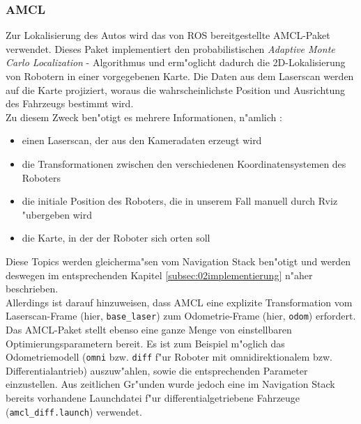 \subsubsection{AMCL}
\label{subsec:02amcl}

Zur Lokalisierung des Autos wird das von ROS bereitgestellte AMCL-Paket verwendet. Dieses Paket implementiert den probabilistischen \emph{Adaptive Monte Carlo Localization} - Algorithmus und erm"oglicht dadurch die 2D-Lokalisierung von Robotern in einer vorgegebenen Karte. Die Daten aus dem Laserscan werden auf die Karte projiziert, woraus die wahrscheinlichste Position und Ausrichtung des Fahrzeugs bestimmt wird.\\
Zu diesem Zweck ben"otigt es mehrere Informationen, n"amlich : 
\begin{itemize}
\item einen Laserscan, der aus den Kameradaten erzeugt wird 
\item die Transformationen zwischen den verschiedenen Koordinatensystemen des Roboters
\item die initiale Position des Roboters, die in unserem Fall manuell durch Rviz "ubergeben wird
\item die Karte, in der der Roboter sich orten soll
\end{itemize}

Diese Topics werden gleicherma"sen vom Navigation Stack ben"otigt und werden deswegen im entsprechenden Kapitel \ref{subsec:02implementierung} n"aher beschrieben.\\
Allerdings ist darauf hinzuweisen, dass AMCL eine explizite Transformation vom Laserscan-Frame (hier, \texttt{base\_laser}) zum Odometrie-Frame (hier, \texttt{odom}) erfordert.\\
Das AMCL-Paket stellt ebenso eine ganze Menge von einstellbaren Optimierungsparametern bereit. Es ist zum Beispiel m"oglich das Odometriemodell (\texttt{omni} bzw. \texttt{diff} f"ur Roboter mit omnidirektionalem bzw. Differentialantrieb) auszuw"ahlen, sowie die entsprechenden Parameter einzustellen. Aus zeitlichen Gr"unden wurde jedoch eine im Navigation Stack bereits vorhandene Launchdatei f"ur differentialgetriebene Fahrzeuge (\texttt{amcl\_diff.launch}) verwendet.